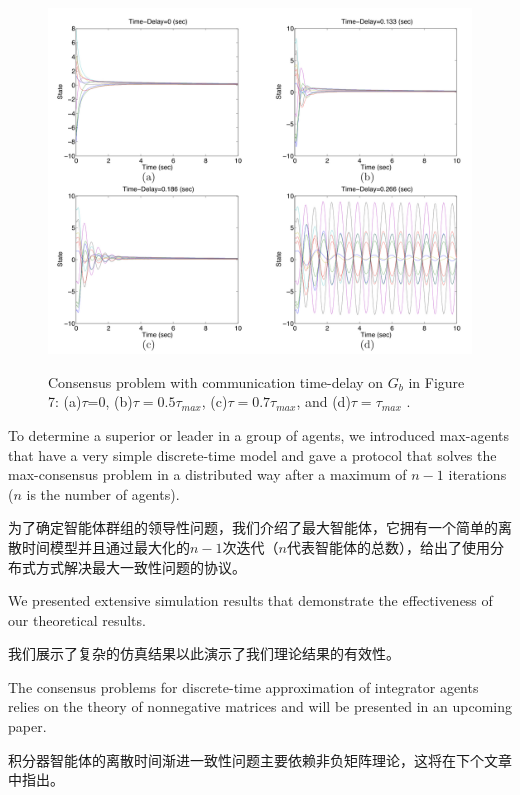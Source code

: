 \documentclass{article}
\begin{document}
\begin{figure}[htbp]
    \centering
    \includegraphics[width=14.5cm]{figures/Fig8-ConsensusProblem.jpeg}
    \label{ConsensusProblem}
    \caption{Consensus problem with communication time-delay on $G_b$ in Figure 7: (a)$\tau$=0, (b)$\tau=0.5\tau_{max}$, (c)$\tau=0.7\tau_{max}$, and (d)$\tau=\tau_{max}$ .}
\end{figure}

{\color[gray]{0.5}
To determine a superior or leader in a group of agents, we introduced max-agents that have a very simple discrete-time model and gave a protocol that solves the max-consensus problem in a distributed way after a maximum of $n−1$ iterations ($n$ is the number of agents).
}

为了确定智能体群组的领导性问题，我们介绍了最大智能体，它拥有一个简单的离散时间模型并且通过最大化的$n-1$次迭代（$n$代表智能体的总数），给出了使用分布式方式解决最大一致性问题的协议。

{\color[gray]{0.5}
We presented extensive simulation results that demonstrate the eﬀectiveness of our theoretical results.
}

我们展示了复杂的仿真结果以此演示了我们理论结果的有效性。

{\color[gray]{0.5}
The consensus problems for discrete-time approximation of integrator agents relies on the theory of nonnegative matrices and will be presented in an upcoming paper.
}

积分器智能体的离散时间渐进一致性问题主要依赖非负矩阵理论，这将在下个文章中指出。
\end{document}
